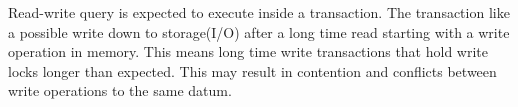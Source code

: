 
Read-write query is expected to execute inside a transaction. The transaction
like a possible write down to storage(I/O) after a long time read starting with
a write operation in memory. This means long time write transactions that hold
write locks longer than expected. This may result in contention and conflicts
between write operations to the same datum.



